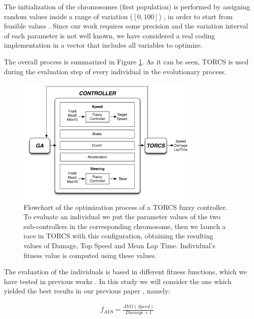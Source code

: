 \documentclass[conference]{IEEEtran}
\begin{document}
The initialization of the chromosomes (first population) is performed by assigning random values inside a range of variation ($[0,100]$)
\cite{GAs_Goldberg89}, in order to start from feasible values
\cite{salem_evo17}. Since our work requires some precision and the variation interval of each parameter is not well known, we have considered a real coding
implementation \cite{elsayed13} in a vector that includes all variables to optimize.

The overall process is summarized in Figure \ref{fig:ga}. As it can be seen, TORCS is used during the evaluation step of every individual in the evolutionary process.

\begin{figure}[!ht]
  \label{fig:ga}
  \begin{center}
    \includegraphics[width=9cm]{fig/flowchart}
  \end{center}
  \caption{Flowchart of  the optimization process of a TORCS fuzzy controller. To evaluate an individual we put the parameter values of the two sub-controllers in the corresponding chromosome, then we launch a race in TORCS with this configuration, obtaining the resulting values of Damage, Top Speed and Mean Lap Time. Individual's fitness value is computed using these values.}
\end{figure}

The evaluation of the individuals is based in different fitness functions, which we have tested in previous works \cite{salem_evo18}. In this study we will consider the one which yielded the best results in our previous paper \cite{salem_cig2018}, namely:

\begin{equation} \label{fit2}
	\begin{array}{lll}
	f_{AVS}= \frac{AVG(Speed)}{Damage+1}
	\end{array}
\end{equation}	
\end{document}
